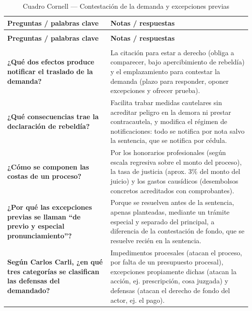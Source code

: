\documentclass[12pt,oneside]{book}
\begin{document}
\begin{longtable}{
    >{\raggedright\arraybackslash}p{}
    >{\raggedright\arraybackslash}p{}
}
\caption{Cuadro Cornell --- Contestación de la demanda y excepciones previas} \\
\toprule
\textbf{Preguntas / palabras clave} & \textbf{Notas / respuestas} \\
\midrule
\endfirsthead

\multicolumn{2}{c}{\textit{(continuación del cuadro Cornell)}} \\
\toprule
\textbf{Preguntas / palabras clave} & \textbf{Notas / respuestas} \\
\midrule
\endhead

\midrule
\multicolumn{2}{r}{\textit{continúa en la página siguiente}} \\
\endfoot

\bottomrule
\endlastfoot

\textbf{¿Qué dos efectos produce notificar el traslado de la demanda?} &
La citación para estar a derecho (obliga a comparecer, bajo apercibimiento de rebeldía) y el emplazamiento para contestar la demanda (plazo para responder, oponer excepciones y ofrecer prueba). \\

\textbf{¿Qué consecuencias trae la declaración de rebeldía?} &
Facilita trabar medidas cautelares sin acreditar peligro en la demora ni prestar contracautela, y modifica el régimen de notificaciones: todo se notifica por nota salvo la sentencia, que se notifica por cédula. \\

\textbf{¿Cómo se componen las costas de un proceso?} &
Por los honorarios profesionales (según escala regresiva sobre el monto del proceso), la tasa de justicia (aprox. 3\% del monto del juicio) y los gastos causídicos (desembolsos concretos acreditados con comprobantes). \\

\textbf{¿Por qué las excepciones previas se llaman ``de previo y especial pronunciamiento''?} &
Porque se resuelven antes de la sentencia, apenas planteadas, mediante un trámite especial y separado del principal, a diferencia de la contestación de fondo, que se resuelve recién en la sentencia. \\

\textbf{Según Carlos Carli, ¿en qué tres categorías se clasifican las defensas del demandado?} &
Impedimentos procesales (atacan el proceso, por falta de un presupuesto procesal), excepciones propiamente dichas (atacan la acción, ej. prescripción, cosa juzgada) y defensas (atacan el derecho de fondo del actor, ej. el pago). \\


\end{longtable}
\end{document}
